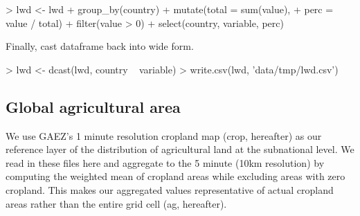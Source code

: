 \documentclass{article}
\begin{document}
\begin{Schunk}
\begin{Sinput}
> lwd <- lwd %
+   group_by(country) %
+   mutate(total = sum(value),
+          perc = value / total) %
+    filter(value > 0) %
+   select(country, variable, perc)
\end{Sinput}
\end{Schunk}

Finally, cast dataframe back into wide form.
\begin{Schunk}
\begin{Sinput}
> lwd <- dcast(lwd, country ~ variable)
> write.csv(lwd, 'data/tmp/lwd.csv')
\end{Sinput}
\end{Schunk}

\subsection{Global agricultural area}

We use GAEZ's 1 minute resolution cropland map (crop, hereafter) as our reference layer of the distribution of agricultural land at the subnational level.  We read in these files here and aggregate to the 5 minute (10km resolution) by computing the weighted mean of cropland areas while excluding areas with zero cropland. This makes our aggregated values representative of actual cropland areas rather than the entire grid cell (ag, hereafter).
\end{document}
